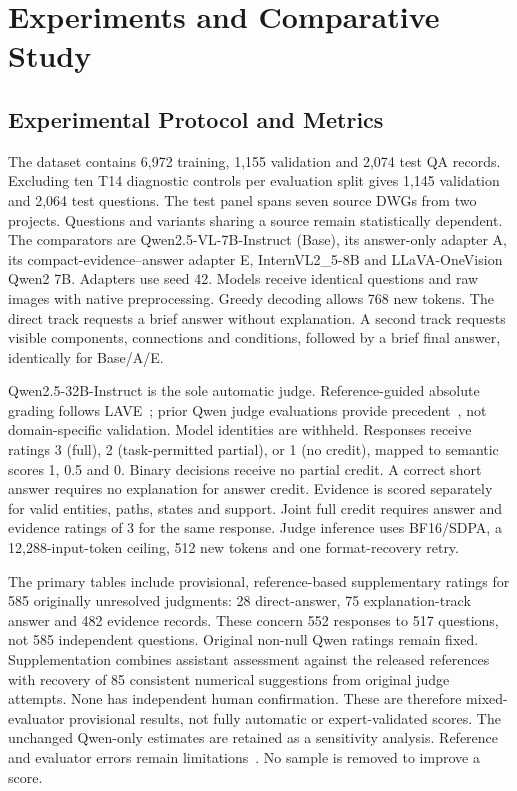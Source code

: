 \section{Experiments and Comparative Study}\label{sec:experiments}
\subsection{Experimental Protocol and Metrics}
The dataset contains 6,972 training, 1,155 validation and 2,074 test QA records. Excluding ten T14 diagnostic controls per evaluation split gives 1,145 validation and 2,064 test questions. The test panel spans seven source DWGs from two projects. Questions and variants sharing a source remain statistically dependent.
The comparators are Qwen2.5-VL-7B-Instruct (Base), its answer-only adapter A, its compact-evidence--answer adapter E, InternVL2\_5-8B and LLaVA-OneVision Qwen2 7B. Adapters use seed 42. Models receive identical questions and raw images with native preprocessing. Greedy decoding allows 768 new tokens. The direct track requests a brief answer without explanation. A second track requests visible components, connections and conditions, followed by a brief final answer, identically for Base/A/E.

Qwen2.5-32B-Instruct is the sole automatic judge. Reference-guided absolute grading follows LAVE~\cite{manas2024lave}; prior Qwen judge evaluations provide precedent~\cite{yu2025risejudge}, not domain-specific validation. Model identities are withheld. Responses receive ratings 3 (full), 2 (task-permitted partial), or 1 (no credit), mapped to semantic scores 1, 0.5 and 0. Binary decisions receive no partial credit. A correct short answer requires no explanation for answer credit. Evidence is scored separately for valid entities, paths, states and support. Joint full credit requires answer and evidence ratings of 3 for the same response. Judge inference uses BF16/SDPA, a 12,288-input-token ceiling, 512 new tokens and one format-recovery retry.

The primary tables include provisional, reference-based supplementary ratings for 585 originally unresolved judgments: 28 direct-answer, 75 explanation-track answer and 482 evidence records. These concern 552 responses to 517 questions, not 585 independent questions. Original non-null Qwen ratings remain fixed. Supplementation combines assistant assessment against the released references with recovery of 85 consistent numerical suggestions from original judge attempts. None has independent human confirmation. These are therefore mixed-evaluator provisional results, not fully automatic or expert-validated scores. The unchanged Qwen-only estimates are retained as a sensitivity analysis. Reference and evaluator errors remain limitations~\cite{zheng2023judge}. No sample is removed to improve a score.

